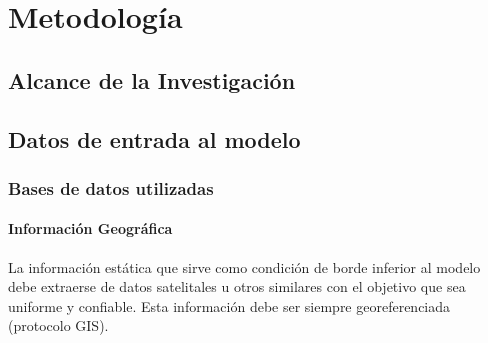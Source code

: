 \chapter{Metodología}
\section{Alcance de la Investigación}

\section{Datos de entrada al modelo}
\subsection{Bases de datos utilizadas}
\subsubsection{Información Geográfica}
La información estática que sirve como condición de borde inferior al modelo debe extraerse de datos satelitales u otros similares con el objetivo que sea uniforme y confiable. Esta información debe ser siempre georeferenciada (protocolo GIS).


